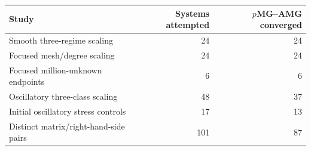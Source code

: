 \begin{tabular}{lrr}
\toprule
Study & Systems attempted & $p$MG--AMG converged \\
\midrule
Smooth three-regime scaling & 24 & 24 \\
Focused mesh/degree scaling & 24 & 24 \\
Focused million-unknown endpoints & 6 & 6 \\
Oscillatory three-class scaling & 48 & 37 \\
Initial oscillatory stress controls & 17 & 13 \\
\midrule
Distinct matrix/right-hand-side pairs & 101 & 87 \\
\bottomrule
\end{tabular}
